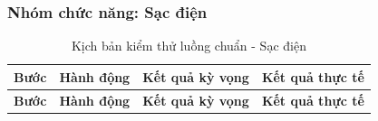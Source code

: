 \subsubsection{Nhóm chức năng: Sạc điện}

\begin{center}
    \renewcommand{\arraystretch}{1.5}
    \begin{longtable}{|c|>{\raggedright\arraybackslash}m{}|>{\raggedright\arraybackslash}m{}|>{\raggedright\arraybackslash}m{}|}
        \caption{Kịch bản kiểm thử luồng chuẩn - Sạc điện}
        \label{tab:charging_happy} \\
        \hline
        \textbf{Bước} & \textbf{Hành động} & \textbf{Kết quả kỳ vọng} & \textbf{Kết quả thực tế} \\
        \hline
        \endfirsthead
        
        \hline
        \textbf{Bước} & \textbf{Hành động} & \textbf{Kết quả kỳ vọng} & \textbf{Kết quả thực tế} \\
        \hline
        \endhead
        

\end{longtable}
\end{center}

